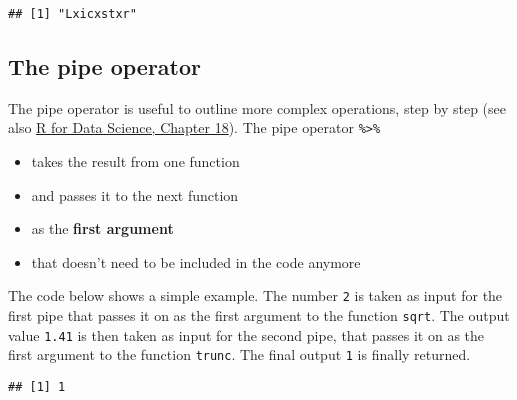 \documentclass[
]{book}
\newenvironment{Shaded}{\begin{snugshade}}{\end{snugshade}}
\newcommand{\DataTypeTok}[1]{\textcolor[rgb]{0.13,0.29,0.53}{#1}}
\newcommand{\DecValTok}[1]{\textcolor[rgb]{0.00,0.00,0.81}{#1}}
\newcommand{\KeywordTok}[1]{\textcolor[rgb]{0.13,0.29,0.53}{\textbf{#1}}}
\newcommand{\NormalTok}[1]{#1}
\newcommand{\OperatorTok}[1]{\textcolor[rgb]{0.81,0.36,0.00}{\textbf{#1}}}
\newcommand{\StringTok}[1]{\textcolor[rgb]{0.31,0.60,0.02}{#1}}
\providecommand{\tightlist}{%
  \setlength{\itemsep}{0pt}\setlength{\parskip}{0pt}}
\begin{document}
\begin{verbatim}
## [1] "Lxicxstxr"
\end{verbatim}

\hypertarget{the-pipe-operator}{%
\subsection{The pipe operator}\label{the-pipe-operator}}

The pipe operator is useful to outline more complex operations, step by step (see also \href{https://r4ds.had.co.nz/pipes.html}{R for Data Science, Chapter 18}). The pipe operator \texttt{\%\textgreater{}\%}

\begin{itemize}
\tightlist
\item
  takes the result from one function
\item
  and passes it to the next function
\item
  as the \textbf{first argument}
\item
  that doesn't need to be included in the code anymore
\end{itemize}

The code below shows a simple example. The number \texttt{2} is taken as input for the first pipe that passes it on as the first argument to the function \texttt{sqrt}. The output value \texttt{1.41} is then taken as input for the second pipe, that passes it on as the first argument to the function \texttt{trunc}. The final output \texttt{1} is finally returned.

\begin{Shaded}
\end{Shaded}

\begin{verbatim}
## [1] 1
\end{verbatim}

\begin{Shaded}
\end{Shaded}
\end{document}
